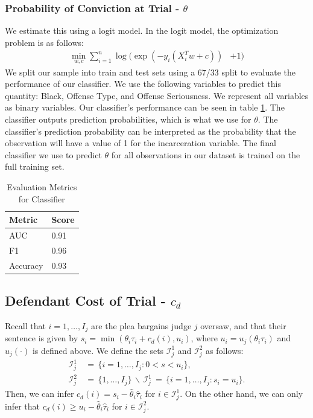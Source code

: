 \documentclass[11pt, oneside]{article}   	%
\theoremstyle{ModifiedStyle}
\begin{document}
	  \subsubsection{Probability of Conviction at Trial - $\theta$}
	    \label{theta-estimation}
	    We estimate this using a logit model. In the logit model, the optimization problem is as follows:
			\begin{align*}
				\min_{w,c} \sum_{i=1}^n \log(\exp(-y_i(X_i^Tw+c)) &+ 1)
			\end{align*}
			We split our sample into train and test sets using a 67/33 split to evaluate the performance of our classifier. We use the following variables to predict this quantity: Black, Offense Type, and Offense Seriousness. We represent all variables as binary variables.  Our classifier's performance can be seen in table \ref{classifier-performance}. The classifier outputs prediction probabilities, which is what we use for $\theta$. The classifier's prediction probability can be interpreted as the probability that the observation will have a value of 1 for the incarceration variable. The final classifier we use to predict $\theta$ for all observations in our dataset is trained on the full training set.

	    \begin{table}[H]
	      \centering
	      \caption{Evaluation Metrics for Classifier}
	      \label{classifier-performance}
	      \begin{tabular}{|l|l|}
	      \hline
	      \textbf{Metric} & \textbf{Score} \\ \hline
	      AUC             & 0.91           \\ \hline
	      F1              & 0.96           \\ \hline
	      Accuracy        & 0.93           \\ \hline
	      \end{tabular}
	    \end{table}

  \subsection{Defendant Cost of Trial - $c_d$}
    \label{c_d-estimation}
    Recall that $i=1,\ldots,I_j$ are the plea bargains judge $j$ oversaw, and that their sentence is given by $s_i=\min(\theta_i\tau_i+c_d(i),u_i)$, where $u_i = u_j(\theta_i\tau_i)$ and $u_j(\cdot)$ is defined above. We define the sets $\mathcal{I}_j^1$ and $\mathcal{I}_j^2$ as follows:
			\begin{align*}
				\mathcal{I}_j^1 &\,=\, \{i=1,\ldots,I_j: 0 < s < u_i\}, \\
				\mathcal{I}_j^2 &\,=\, \{1,\ldots,I_j\} \,\backslash\, \mathcal{I}_j^1 \,=\, \{i=1,\ldots,I_j:s_i=u_i\}.
			\end{align*}
			Then, we can infer $c_d(i) = s_i - \hat{\theta}_i\hat{\tau}_i$ for $i\in\mathcal{I}_j^1$. On the other hand, we can only infer that $c_d(i) \geq u_i - \hat{\theta}_i\hat{\tau}_i$ for $i\in\mathcal{I}^2_j$.
\end{document}
